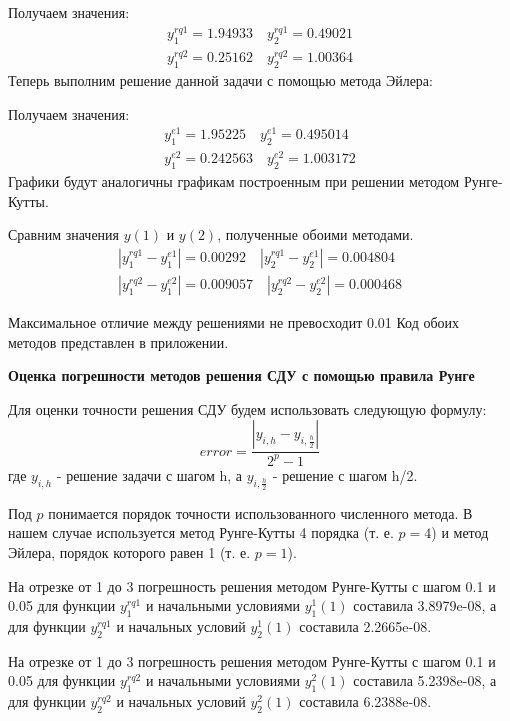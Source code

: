 \documentclass[a4paper,12pt]{article}
\begin{document}

Получаем значения: 
$$
\begin{array}{c}
	y^{rq1}_{1} = 1.94933 \quad y^{rq1}_{2} = 0.49021 \\
	y^{rq2}_{1} = 0.25162 \quad y^{rq2}_{2} = 1.00364 	
\end{array}$$
Теперь выполним решение данной задачи с помощью метода Эйлера:

Получаем значения: 
$$
\begin{array}{c}
	 y^{e1}_{1} = 1.95225 \quad y^{e1}_{2} = 0.495014 \\
	 y^{e2}_{1} = 0.242563 \quad  y^{e2}_{2} = 1.003172 	
\end{array}$$
Графики будут аналогичны графикам построенным при решении методом Рунге-Кутты. 

Сравним значения $ y(1) $ и $ y(2) $, полученные обоими методами.
$$
\begin{array}{c}
	|y^{rq1}_{1}-y^{e1}_{1}| = 0.00292 \quad |y^{rq1}_{2}-y^{e1}_{2}| = 0.004804 \\
	|y^{rq2}_{1}-y^{e2}_{1}| = 0.009057 \quad  |y^{rq2}_{2}-y^{e2}_{2}|  = 0.000468 	
\end{array}$$

Максимальное отличие между решениями не превосходит 0.01 Код обоих методов представлен в приложении.
\clearpage
\begin{center}
	\textbf{Оценка погрешности методов решения СДУ с помощью правила Рунге}
\end{center}
Для оценки точности решения СДУ будем использовать следующую формулу:
$$error = \dfrac{| y_{i,h} - y_{i,\frac{h}{2}}|}{2^p - 1}$$ 
где $  y_{i,h} $ - решение задачи с шагом h, а $  y_{i,\frac{h}{2}}  $ - решение с шагом h/2.

Под $ p $ понимается порядок точности использованного численного метода. В нашем случае используется метод Рунге-Кутты 4 порядка (т. е. $ p = 4 $) и метод Эйлера, порядок которого равен 1 (т. е. $ p = 1 $).

На отрезке от 1 до 3 погрешность решения методом Рунге-Кутты с шагом 0.1 и 0.05  для функции $ y^{rq1}_{1} $ и начальными условиями $ y^{1}_{1}(1)$ составила 3.8979e-08, а для функции $ y^{rq1}_{2} $ и начальных условий $ y^{1}_{2}(1) $ составила 2.2665e-08.

На отрезке от 1 до 3 погрешность решения методом Рунге-Кутты с шагом 0.1 и 0.05  для функции $ y^{rq2}_{1} $ и начальными условиями $ y^{2}_{1}(1)$ составила 5.2398e-08, а для функции $ y^{rq2}_{2} $ и начальных условий $ y^{2}_{2}(1) $ составила 6.2388e-08.
\end{document}
